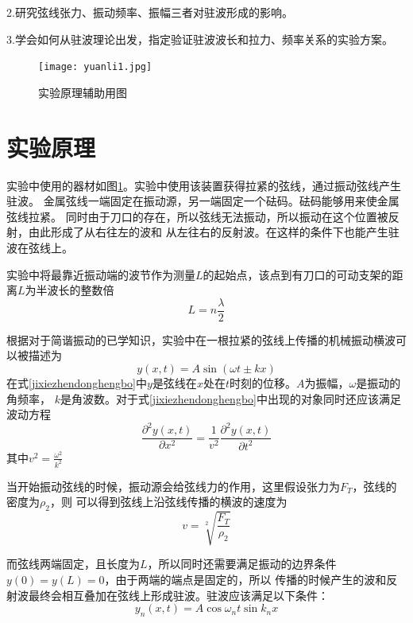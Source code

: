 \documentclass{ctexart}
\begin{document}
  2.\quad 研究弦线张力、振动频率、振幅三者对驻波形成的影响。
  
  3.\quad 学会如何从驻波理论出发，指定验证驻波波长和拉力、频率关系的实验方案。
  \begin{figure}[h]
    \centering
    \texttt{[image: yuanli1.jpg]}
    \caption{实验原理辅助用图}\label{figureyuanli1}
  \end{figure}

\section{实验原理}
实验中使用的器材如图\ref{figureyuanli1}。实验中使用该装置获得拉紧的弦线，通过振动弦线产生驻波。
金属弦线一端固定在振动源，另一端固定一个砝码。砝码能够用来使金属弦线拉紧。
同时由于刀口的存在，所以弦线无法振动，所以振动在这个位置被反射，由此形成了从右往左的波和
从左往右的反射波。在这样的条件下也能产生驻波在弦线上。

实验中将最靠近振动端的波节作为测量$L$的起始点，该点到有刀口的可动支架的距离$L$为半波长的整数倍
\begin{equation}
  L=n \frac{\lambda}{2}
\end{equation}

根据对于简谐振动的已学知识，实验中在一根拉紧的弦线上传播的机械振动横波可以被描述为
\begin{equation}\label{jixiezhendonghengbo}
  y(x,t)=A\sin ( \omega t \pm kx)
\end{equation}
在式\ref{jixiezhendonghengbo}中$y$是弦线在$x$处在$t$时刻的位移。$A$为振幅，$\omega$是振动的角频率，
$k$是角波数。对于式\ref{jixiezhendonghengbo}中出现的对象同时还应该满足波动方程
\begin{equation}\label{bodongfangcheng}
  \frac{\partial ^{2} y(x,t)}{\partial x^{2}} = \frac{1}{v^{2}} \frac{\partial ^{2} y(x,t)}{\partial t^{2}}
\end{equation}
其中$v^{2} = \frac{\omega ^{2}}{k^{2}}$

当开始振动弦线的时候，振动源会给弦线力的作用，这里假设张力为$F_{T}$，弦线的密度为$\rho _{2}$，则
可以得到弦线上沿弦线传播的横波的速度为
\begin{equation}\label{bosufangcheng}
  v=\sqrt[2]{\frac{F_{T}}{\rho _{2}}}
\end{equation}

而弦线两端固定，且长度为$L$，所以同时还需要满足振动的边界条件$y(0)=y(L)=0$，由于两端的端点是固定的，所以
传播的时候产生的波和反射波最终会相互叠加在弦线上形成驻波。驻波应该满足以下条件：
\begin{equation}\label{zhubofangcheng}
  y_{n}(x,t)=A\cos \omega _{n} t \sin k_{n} x
\end{equation}
\end{document}
